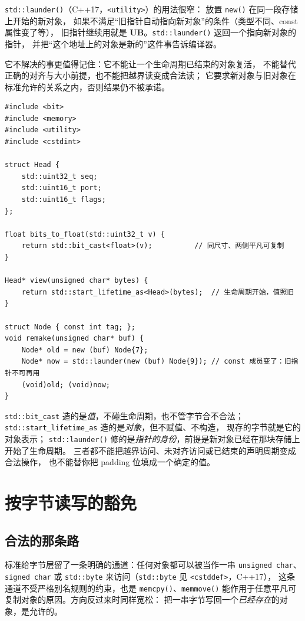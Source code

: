 \documentclass[12pt,a4paper,fontset=fandol]{ctexbook}
\newcommand{\cpp}[1]{C++#1}
\newcommand{\Fn}[1]{\texttt{#1()}}
\newcommand{\Tp}[1]{\texttt{#1}}
\newcommand{\Bk}{\discretionary{}{}{}}
\newcommand{\UB}{\textbf{\textsf{UB}}}
\newcommand{\Hdr}[1]{\texttt{<#1>}}
\begin{document}
\Fn{std::launder}（\cpp{17}，\Hdr{utility}）的用法很窄：
放置 \Fn{new} 在同一段存储上开始的新对象，
如果不满足“旧指针自动指向新对象”的条件（类型不同、const 属性变了等），
旧指针继续用就是 \UB{}。\Fn{std::launder} 返回一个指向新对象的指针，
并把“这个地址上的对象是新的”这件事告诉编译器。

它不解决的事更值得记住：它不能让一个生命周期已结束的对象复活，
不能替代正确的对齐与大小前提，也不能把越界读变成合法读；
它要求新对象与旧对象在标准允许的关系之内，否则结果仍不被承诺。

\begin{lstlisting}[style=cppstyle, caption={三个出口各自的典型用法}]
#include <bit>
#include <memory>
#include <utility>
#include <cstdint>

struct Head {
    std::uint32_t seq;
    std::uint16_t port;
    std::uint16_t flags;
};

float bits_to_float(std::uint32_t v) {
    return std::bit_cast<float>(v);          // 同尺寸、两侧平凡可复制
}

Head* view(unsigned char* bytes) {
    return std::start_lifetime_as<Head>(bytes);  // 生命周期开始，值照旧
}

struct Node { const int tag; };
void remake(unsigned char* buf) {
    Node* old = new (buf) Node{7};
    Node* now = std::launder(new (buf) Node{9}); // const 成员变了：旧指针不可再用
    (void)old; (void)now;
}
\end{lstlisting}

\begin{compare}[title={三个出口能做什么、不能做什么}]
\Tp{std::bit\_cast} 造的是\emph{值}，不碰生命周期，也不管字节合不合法；
\Tp{std::start{\Bk}\_lifetime{\Bk}\_as} 造的是\emph{对象}，但不赋值、不构造，
现存的字节就是它的对象表示；
\Fn{std::launder} 修的是\emph{指针的身份}，前提是新对象已经在那块存储上开始了生命周期。
三者都不能把越界访问、未对齐访问或已结束的声明周期变成合法操作，
也不能替你把 padding 位填成一个确定的值。
\end{compare}

\section{按字节读写的豁免}\label{sec:ub04-byte-access}

\subsection{合法的那条路}\label{sec:ub04-byte-path}

标准给字节层留了一条明确的通道：任何对象都可以被当作一串 \Tp{unsigned char}、
\Tp{signed char} 或 \Tp{std::byte} 来访问（\Tp{std::byte} 见 \Hdr{cstddef}，\cpp{17}），
这条通道不受严格别名规则的约束，也是 \Fn{memcpy}、\Fn{memmove}
能作用于任意平凡可复制对象的原因。方向反过来时同样宽松：
把一串字节写回一个\emph{已经存在}的对象，是允许的。
\end{document}
